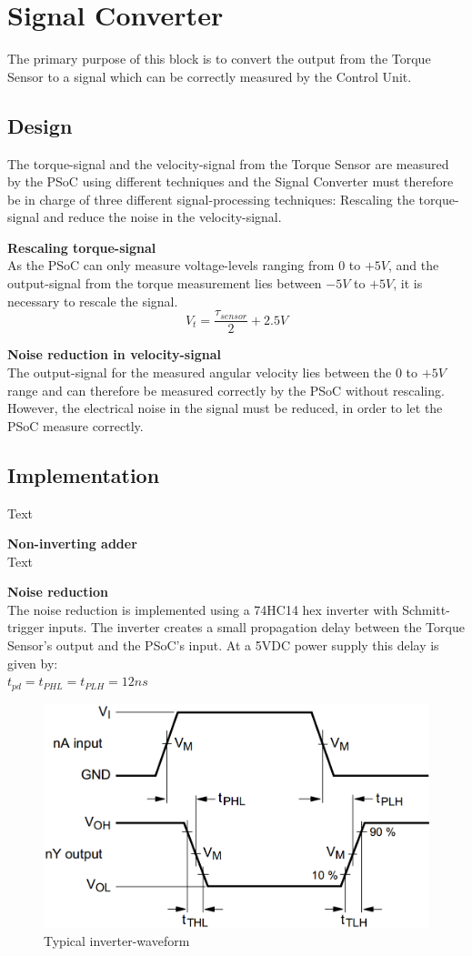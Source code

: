 \newpage
\section{Signal Converter}
The primary purpose of this block is to convert the output from the Torque Sensor to a signal which can be correctly measured by the Control Unit.

\subsection{Design}
The torque-signal and the velocity-signal from the Torque Sensor are measured by the PSoC using different techniques and the Signal Converter must therefore be in charge of three different signal-processing techniques: Rescaling the torque-signal and reduce the noise in the velocity-signal.

\textbf{Rescaling torque-signal}\\
As the PSoC can only measure voltage-levels ranging from $0$ to $+5 V$, and the output-signal from the torque measurement lies between $-5 V$ to $+5 V$, it is necessary to rescale the signal.
\begin{equation}
	V_t = \frac{\tau_{sensor} }{2} + 2.5 V
\end{equation}

\textbf{Noise reduction in velocity-signal}\\
The output-signal for the measured angular velocity lies between the $0$ to $+5 V$ range and can therefore be measured correctly by the PSoC without rescaling. However, the electrical noise in the signal must be reduced, in order to let the PSoC measure correctly.

\subsection{Implementation}
Text

\textbf{Non-inverting adder}\\
Text

\textbf{Noise reduction}\\
The noise reduction is implemented using a 74HC14 hex inverter with Schmitt-trigger inputs. The inverter creates a small propagation delay between the Torque Sensor's output and the PSoC's input. At a 5VDC power supply this delay is given by:\\
$t_{pd} = t_{PHL} = t_{PLH} = 12 ns$


\begin{figure}[H]
	\centering
	\includegraphics[width=0.5\linewidth]{Hardware/Pictures/74HC14_waveform}
	\caption{Typical inverter-waveform}
	\label{fig:SchmittTrigger_waveform}
\end{figure}

